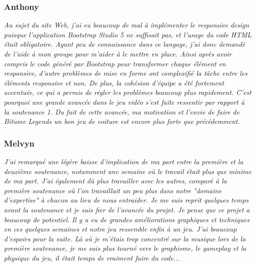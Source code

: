\documentclass[12pt,a4paper]{article}
\begin{document}
            \subsubsection{Anthony}
                \textit{Au sujet du site Web, j'ai eu beaucoup de mal à implémenter le responsive design
                puisque l'application Bootstrap Studio 5 ne suffisait pas, et l'usage du code HTML était
                obligatoire. Ayant peu de connaissance dans ce langage, j'ai donc demandé
                de l'aide à mon groupe pour m'aider à le mettre en place. Ainsi après avoir compris le
                code généré par Bootstrap pour transformer chaque élément en responsive, d'autre
                problèmes de mise en forme ont complexifié la tâche entre les éléments responsive et
                non. De plus, la cohésion d'équipe a été fortement accentuée, ce qui a permis de régler 
                les problèmes beaucoup plus rapidement. C'est pourquoi une grande avancée dans le 
                jeu vidéo s'est faite ressentir par rapport à la soutenance 1. Du fait de cette avancée, 
                ma motivation et l'envie de faire de Bitume Legends un bon jeu de voiture est encore 
                plus forte que précédemment.}

            \subsubsection{Melvyn}
                \textit{J'ai remarqué une légère baisse d'implication de ma part entre la 
                première et la deuxième soutenance, notamment une semaine où le 
                travail était plus que minime de ma part. J'ai également dû plus 
                travailler avec les autres, comparé à la première soutenance où l'on
                travaillait un peu plus dans notre "domaine d'expertise" à chacun 
                au lieu de nous entraider. Je me suis reprit quelques temps avant la
                soutenance et je suis fier de l'avancée du projet. Je pense que ce projet
                a beaucoup de potentiel. Il y a eu de grandes améliorations graphiques et
                techniques en ces quelques semaines et notre jeu ressemble enfin à un jeu.
                J'ai beaucoup d'espoirs pour la suite. Là où je m'étais trop concentré sur
                la musique lors de la première soutenance, je me suis plus tourné vers
                le graphisme, le gameplay et la physique du jeu, il était temps de vraiment
                faire du code...}
\end{document}
